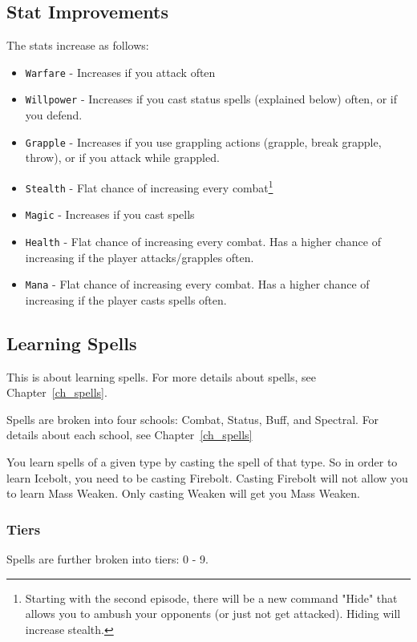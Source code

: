 \documentclass{report}
\begin{document}
\begin{itemize}
\begin{itemize}
\subsection{Stat Improvements}
The stats increase as follows:
\begin{itemize}
    \item \verb|Warfare| - Increases if you attack often
    \item \verb|Willpower| - Increases if you cast status spells (explained below) often, or if you defend.
    \item \verb|Grapple| - Increases if you use grappling actions 
    (grapple, break grapple, throw), or if you attack while grappled.
    \item \verb|Stealth| - Flat chance of increasing every combat\footnote{
Starting with the second episode, there will be a new command "Hide" that allows you to ambush your opponents (or just not get attacked). Hiding will increase stealth.}
    \item \verb|Magic| - Increases if you cast spells
    \item \verb|Health| - Flat chance of increasing every combat. Has a higher
    chance of increasing if the player attacks/grapples often.
    \item \verb|Mana| - Flat chance of increasing every combat. Has a higher
    chance of increasing if the player casts spells often.
\end{itemize}


\subsection{Learning Spells}

This is about learning spells. For more details about spells, see Chapter~\ref{ch_spells}.

Spells are broken into four schools: Combat, Status, Buff, and Spectral. For 
details about each school, see Chapter~\ref{ch_spells}


You learn spells of a given type by casting the spell of that type. So in order to learn Icebolt, you need to be casting Firebolt.  Casting Firebolt will not allow you to learn Mass Weaken. Only casting Weaken will get you Mass Weaken.

\subsubsection{Tiers}
Spells are further broken into tiers: 0 - 9.


\end{itemize}
\end{itemize}
\end{document}
